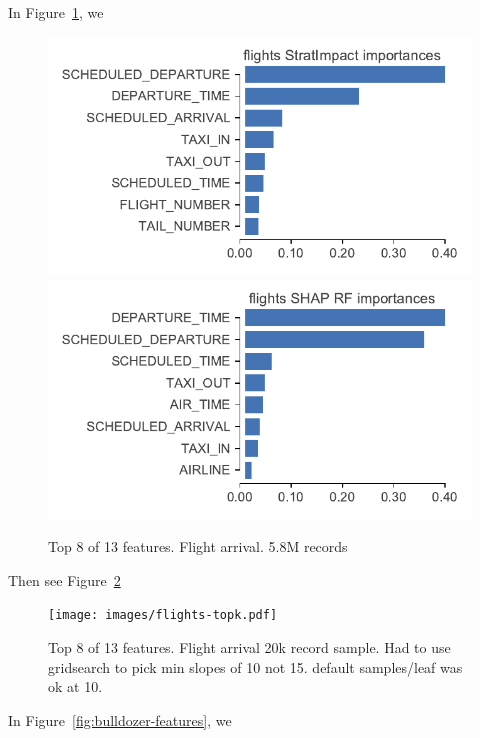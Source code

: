\documentclass[12pt]{article}
\newcommand{\figref}[1]{Figure~\ref{#1}}
\begin{document}
In \figref{fig:flights-features}, we

\begin{figure}[htbp]
\begin{center}
\includegraphics[scale=0.6]{images/flights-features.pdf}
\includegraphics[scale=0.6]{images/flights-features-shap-rf.pdf}
\caption{Top 8 of 13 features. Flight arrival. 5.8M records}
\label{fig:flights-features}
\end{center}
\end{figure}

Then see \figref{fig:flights-topk}

\begin{figure}[htbp]
\begin{center}
\texttt{[image: images/flights-topk.pdf]}
\caption{Top 8 of 13 features. Flight arrival 20k record sample. Had to use gridsearch to pick min slopes of 10 not 15. default samples/leaf was ok at 10.}
\label{fig:flights-topk}
\end{center}
\end{figure}


In \figref{fig:bulldozer-features}, we
\end{document}

